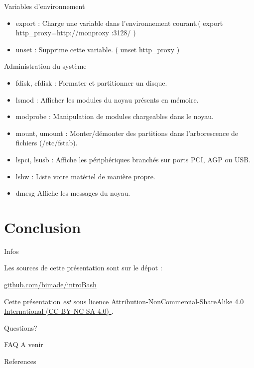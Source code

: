 \documentclass[10pt]{beamer}
\begin{document}
\begin{frame}{Variables d'environnement}
\begin{itemize}
\item \alert{export} : Charge une variable dans l'environnement courant.( export http\_proxy=http://monproxy :3128/ )
\item \alert{unset} : Supprime cette variable. ( unset http\_proxy )
\end{itemize}
\end{frame}

\begin{frame}{Administration du système}
\begin{itemize}
\item \alert{fdisk}, \alert{cfdisk} : Formater et partitionner un disque.
\item \alert{lsmod} : Afficher les modules du noyau présents en mémoire.
\item \alert{modprobe} : Manipulation de modules chargeables dans le noyau.
\item \alert{mount}, \alert{umount} : Monter/démonter des partitions dans l'arborescence de fichiers (/etc/fstab).
\item \alert{lspci}, \alert{lsusb} : Affiche les périphériques branchés sur ports PCI, AGP ou USB.
\item \alert{lshw} : Liste votre matériel de manière propre.
\item \alert{dmesg} Affiche les messages du noyau.
\end{itemize}
\end{frame}

\section{Conclusion}

\begin{frame}{Infos}

  Les sources de cette présentation sont sur le dépot :

  \begin{center}\url{github.com/bimade/introBash}\end{center}

  Cette présentation \emph{est} sous licence
  \href{http://creativecommons.org/licenses/by-nc-sa/4.0/}
  {Attribution-NonCommercial-ShareAlike 4.0 International (CC BY-NC-SA 4.0) }.

  \begin{center}\ccbyncsa\end{center}

\end{frame}

{
\begin{frame}[standout]
  Questions?
\end{frame}
}

\appendix

\begin{frame}[fragile]{FAQ}
  A venir
\end{frame}

\begin{frame}[allowframebreaks]{References}

  
  

\end{frame}
\end{document}

